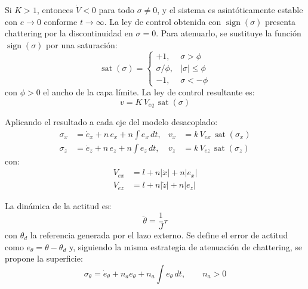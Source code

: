 \begin{enumerate}
\begin{itemize}
        Si $K>1$, entonces $\dot{V}<0$ para todo $\sigma\neq 0$, y el sistema es asintóticamente estable con $e\to 0$ conforme $t\to\infty$. La ley de control obtenida con $\operatorname{sign}(\sigma)$ presenta chattering por la discontinuidad en $\sigma=0$. Para atenuarlo, se sustituye la función $\operatorname{sign}(\sigma)$ por una saturación:
        \begin{equation*}
            \operatorname{sat}(\sigma) = \begin{cases}
                +1, & \sigma > \phi \\
                \sigma/\phi, & |\sigma|\le \phi \\
                -1, & \sigma < -\phi
            \end{cases}
        \end{equation*}
        con $\phi>0$ el ancho de la capa límite. La ley de control resultante es:
        \begin{equation*}
            v = K\,V_{eq}\,\operatorname{sat}(\sigma)
        \end{equation*}

        Aplicando el resultado a cada eje del modelo desacoplado:
        \begin{equation*}
            \begin{aligned}
                \sigma_x &= \dot{e}_x + n\,e_x + n\int e_x\,dt, & v_x &= k\,V_{ex}\,\operatorname{sat}(\sigma_x) \\
                \sigma_z &= \dot{e}_z + n\,e_z + n\int e_z\,dt, & v_z &= k\,V_{ez}\,\operatorname{sat}(\sigma_z)
            \end{aligned}
        \end{equation*}
        con:
        \begin{equation*}
            \begin{aligned}
                V_{ex} &= l + n|\dot{x}| + n|e_x| \\
                V_{ez} &= l + n|\dot{z}| + n|e_z|
            \end{aligned}
        \end{equation*}

        La dinámica de la actitud es:
        \begin{equation*}
            \ddot{\theta} = \frac{1}{J}\tau
        \end{equation*}
        con $\theta_d$ la referencia generada por el lazo externo. Se define el error de actitud como $e_\theta = \theta-\theta_d$ y, siguiendo la misma estrategia de atenuación de chattering, se propone la superficie:
        \begin{equation*}
            \sigma_\theta = \dot{e}_\theta + n_a e_\theta + n_a \int e_\theta\,dt,\qquad n_a>0
        \end{equation*}


\end{itemize}
\end{enumerate}
